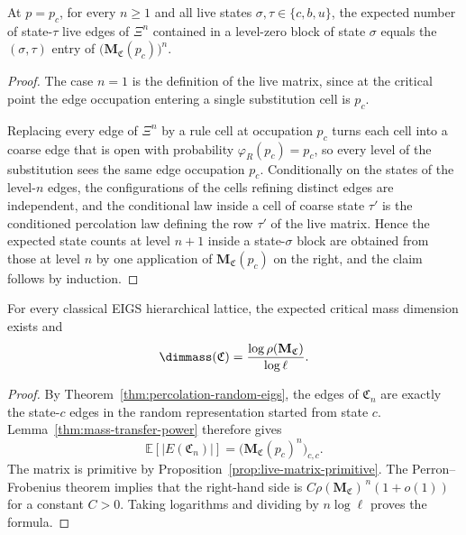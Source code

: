 \begin{lemma}\label{thm:mass-transfer-power}
At $p=p_c$, for every $n\ge1$ and all live states $\sigma,\tau\in\{c,b,u\}$, the expected number of state-$\tau$ live edges of $\Xi^{n}$ contained in a level-zero block of state $\sigma$ equals the $(\sigma,\tau)$ entry of $\bigl(\mathbf M_{\mathfrak C}(p_c)\bigr)^{n}$.
\end{lemma}

\begin{proof}
The case $n=1$ is the definition of the live matrix, since at the critical point the edge occupation entering a single substitution cell is $p_c$.

Replacing every edge of $\Xi^{n}$ by a rule cell at occupation $p_c$ turns each cell into a coarse edge that is open with probability $\varphi_R(p_c)=p_c$, so every level of the substitution sees the same edge occupation $p_c$.
Conditionally on the states of the level-$n$ edges, the configurations of the cells refining distinct edges are independent, and the conditional law inside a cell of coarse state $\tau'$ is the conditioned percolation law defining the row $\tau'$ of the live matrix.
Hence the expected state counts at level $n+1$ inside a state-$\sigma$ block are obtained from those at level $n$ by one application of $\mathbf M_{\mathfrak C}(p_c)$ on the right, and the claim follows by induction.
\end{proof}


\begin{theorem}\label{thm:critical-mass-dimension}
For every classical EIGS hierarchical lattice, the expected critical mass dimension exists and
\[
 \dimmass(\mathfrak C)=\frac{\log\rho(\mathbf M_{\mathfrak C})}{\log\ell}.
\]
\end{theorem}
\begin{proof}
By Theorem~\ref{thm:percolation-random-eigs}, the edges of $\mathfrak C_n$ are exactly the state-$c$ edges in the random representation started from state $c$.
Lemma~\ref{thm:mass-transfer-power} therefore gives
\[
 \mathbb E[|E(\mathfrak C_n)|]
 =\bigl(\mathbf M_{\mathfrak C}(p_c)^n\bigr)_{c,c}.
\]
The matrix is primitive by Proposition~\ref{prop:live-matrix-primitive}.
The Perron--Frobenius theorem implies that the right-hand side is $C\rho(\mathbf M_{\mathfrak C})^{\,n}(1+o(1))$ for a constant $C>0$.
Taking logarithms and dividing by $n\log\ell$ proves the formula.
\end{proof}

